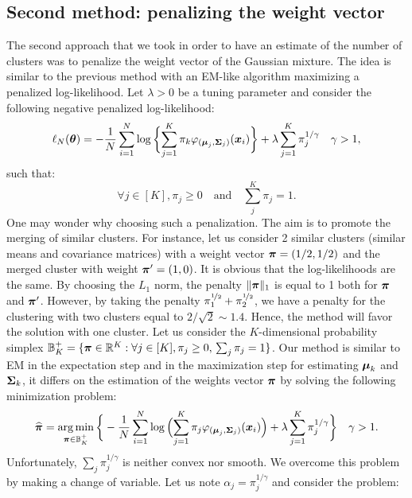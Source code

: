 \subsection{Second method: penalizing the weight vector}
\label{sparse_weight_vect_estim}
The second approach that we took in order to have an estimate of the number of clusters was to penalize the weight vector of the Gaussian mixture. The idea is similar to the previous method with an EM-like algorithm maximizing a penalized log-likelihood. Let $\lambda > 0$ be a tuning parameter and consider the following negative penalized log-likelihood:
\begin{equation}
  \ell_N({\boldsymbol\theta})=
-\frac{1}{N}\sum_{i=1}^{N}\log\bigg\{{\sum_{j=1}^K\pi_k\varphi_{(\boldsymbol\mu_{j},\boldsymbol\Sigma_{j})}(\boldsymbol x_i)}\bigg\}+\lambda\sum_{j=1}^{K}\pi_j^{1/\gamma}\quad \gamma > 1,
\end{equation}
such that:
\begin{equation}
  \forall j\in[K], \pi_j \geq 0 \quad \text{and} \quad \sum_{j}^{K}\pi_j=1.
\end{equation}
One may wonder why choosing such a penalization. The aim is to promote the merging of similar clusters. For instance, let us consider 2 similar clusters (similar means and covariance matrices) with a weight vector $\boldsymbol \pi=(1/2, 1/2)$ and the merged cluster with weight $\boldsymbol \pi'=(1, 0)$. It is obvious that the log-likelihoods are the same. By choosing the $L_1$ norm, the penalty $\|\boldsymbol \pi\|_1$ is equal to 1 both for $\boldsymbol \pi$ and $\boldsymbol \pi'$. However, by taking the penalty $\pi_1^{\nicefrac{1}{2}}+\pi_2^{\nicefrac{1}{2}}$, we have a penalty for the clustering with two clusters equal to $2/\sqrt{2}\sim 1.4$. Hence, the method will favor the solution with one cluster. Let us consider the $K$-dimensional probability simplex ${\mathbb B}^+_K=\{\boldsymbol \pi\in {\mathbb R}^K: \forall j\in[K], \pi_j \geq 0,\,  \sum_{j}\pi_j=1\}$. Our method is similar to EM in the expectation step and in the maximization step for estimating $\boldsymbol\mu_k$ and $\boldsymbol\Sigma_k$, it differs on the estimation of the weights vector $\boldsymbol \pi$ by solving the following minimization problem:
\begin{equation}
  \widehat{\boldsymbol \pi}= \operatorname*{arg\,min}_{\boldsymbol \pi\in{\mathbb B}^+_K}\bigg\{
-\frac{1}{N}\sum_{i=1}^{N}\log\Big({\sum_{j=1}^K\pi_j\varphi_{(\boldsymbol\mu_{j},\boldsymbol\Sigma_{j})}(\boldsymbol x_i)}\Big)+\lambda\sum_{j=1}^{K}\pi_j^{1/\gamma}\bigg\} \quad \gamma > 1.
\end{equation}
Unfortunately, $\sum_{j}\pi_j^{1/\gamma}$ is neither convex nor smooth. We overcome this problem by making a change of variable. Let us note $\alpha_j = \pi_j^{1/\gamma}$ and consider the problem:
